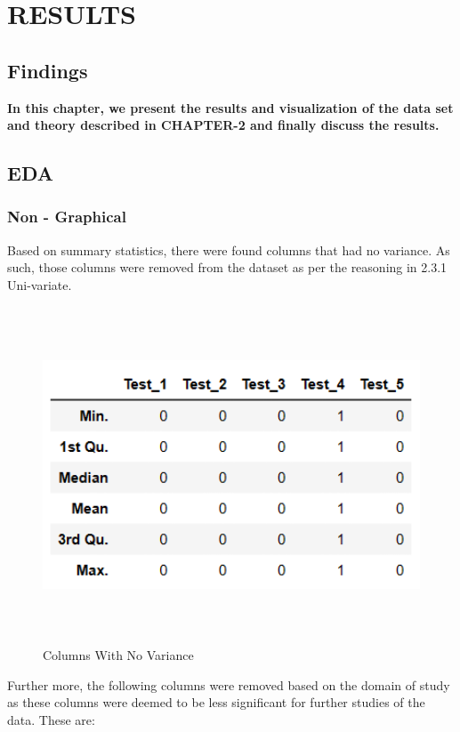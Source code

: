 \chapter{RESULTS}

\section{{\bf{Findings}}}
{\bf In this chapter, we present the results and visualization of the data set and theory described in CHAPTER-2 and finally discuss the results.
}

\section{\bf EDA}
\subsection{Non - Graphical}
Based on summary statistics, there were found columns that had no variance. As such, those columns were removed from the dataset as per the reasoning in 2.3.1 Uni-variate.\\ 

\begin{figure}[htpb]
	\centering
	\includegraphics[height=10cm, width=12cm]{figures/s_stat.png}
	\caption{Columns With No Variance}
	\label{fig:columns}
\end{figure}
\noindent
Further more, the following columns were removed based on the domain of study as these columns were deemed to be less significant for further studies of the data. These are:

